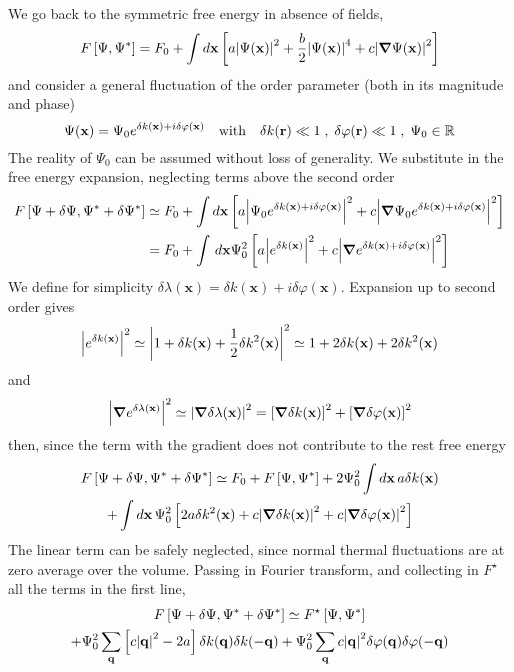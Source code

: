 We go back to the symmetric free energy in absence of fields,
\[ 
    F\left[{\Psi,\Psi^*}\right] = F_0 + \int d\mathbf{x} \left[{
        a \abs{\Psi(\mathbf{x}) }^2 + \frac{b}{2} \abs{ \Psi(\mathbf{x}) }^4 + c \abs{\grad \Psi(\mathbf{x}) }^2
    }\right]
\]
and consider a general fluctuation of the order parameter (both in its magnitude and phase)
\[
    \Psi(\mathbf{x}) = \Psi_0 e^{\delta k(\mathbf{x}) + i \delta \varphi(\mathbf{x})}
    \qq{with}
    \delta k(\mathbf{r}) \ll 1
    \;,\;
    \delta \varphi(\mathbf{r}) \ll 1
    \;,\;
    \Psi_0 \in \R
\]
The reality of $\Psi_0$ can be assumed without loss of generality. We substitute in the free energy expansion, neglecting terms above the second order
\[
\begin{aligned}
    F\left[{\Psi + \delta\Psi,\Psi^* + \delta\Psi^*}\right] &\simeq F_0 + \int d\mathbf{x} \left[{
        a \abs{ \Psi_0 e^{\delta k(\mathbf{x}) + i \delta \varphi(\mathbf{x})} }^2+ c \abs{\grad \Psi_0 e^{\delta k(\mathbf{x}) + i \delta \varphi(\mathbf{x})} }^2
    }\right] \\
    &= F_0 + \int \, d\mathbf{x} \Psi_0^2 \left[{
        a \abs{ e^{\delta k(\mathbf{x})} }^2+ c \abs{\grad  e^{\delta k(\mathbf{x}) + i \delta \varphi(\mathbf{x})} }^2
    }\right]
\end{aligned}
\]
We define for simplicity $\delta\lambda(\mathbf{x}) = \delta k(\mathbf{x}) + i \delta\varphi(\mathbf{x})$. Expansion up to second order gives
\[
    \abs{ e^{\delta k(\mathbf{x})} }^2 \simeq \abs{ 1 + \delta k (\mathbf{x}) + \half \delta k^2(\mathbf{x}) }^2 \simeq 1 + 2 \delta k (\mathbf{x}) + 2  \delta k^2 (\mathbf{x})
\]
and
\[
    \abs{ \grad e^{\delta \lambda(\mathbf{x})} }^2 \simeq \abs{\grad \delta \lambda(\mathbf{x})}^2
    = \left[{\grad \delta k (\mathbf{x})}\right]^2 + \left[{\grad \delta \varphi (\mathbf{x})}\right]^2
\]
then, since the term with the gradient does not contribute to the rest free energy
\begin{multline*}
    F \left[{\Psi + \delta\Psi,\Psi^* + \delta\Psi^*}\right] \simeq F_0 + F \left[{\Psi,\Psi^*}\right] + 2 \Psi_0^2 \int d\mathbf{x} \, a \delta k(\mathbf{x}) \\
    + \int d\mathbf{x} \, \Psi_0^2 \left[{ 2 a \delta k^2 (\mathbf{x}) + c \abs{\grad \delta k (\mathbf{x})}^2 + c \abs{\grad \delta \varphi (\mathbf{x})}^2 }\right]
\end{multline*}
The linear term can be safely neglected, since normal thermal fluctuations are at zero average over the volume. Passing in Fourier transform, and collecting in $F^\star$ all the terms in the first line,
\begin{multline*}
    F \left[{\Psi + \delta\Psi,\Psi^* + \delta\Psi^*}\right] \simeq F^\star \left[{ \Psi,\Psi^* }\right] \\
    + \Psi_0^2 \sum_\mathbf{q} \left[{ c \abs{\mathbf{q}}^2 - 2a }\right] \delta k( \mathbf{q} ) \delta k (-\mathbf{q}) + \Psi_0^2 \sum_\mathbf{q} c \abs{\mathbf{q}}^2 \delta \varphi( \mathbf{q} ) \delta \varphi (-\mathbf{q})
\end{multline*}

